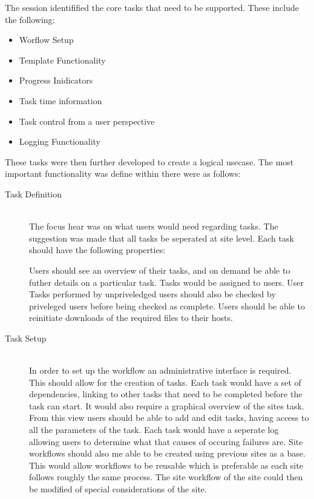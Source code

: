 \documentclass[12pt,a4paper]{report}
\begin{document}
The session identifified the core tasks that need to be supported. These
include the following:
\begin{itemize}
    \item Worflow Setup
    \item Template Functionality
    \item Progress Inidicators
    \item Task time information
    \item Task control from a user perspective
    \item Logging Functionality
\end{itemize}
These tasks were then further developed to create a logical usecase. The
most important functionality was define within there were as follows:
\begin{description}
    \item[Task Definition] \hfill \\
        The focus hear was on what users would need regarding tasks.
        The suggestion was made that all tasks be seperated at site level.
        Each task should have the following properties:
        Users should see an overview of their tasks, and on demand be able to
        futher details on a particular task. Tasks would be assigned to users.
        User Tasks performed by unpriveledged users should also be checked by
        priveleged users before being checked as complete. Users should be
        able to reinitiate downloads of the required files to their hosts.

    \item[Task Setup] \hfill \\
        In order to set up the workflow an administrative interface is required.
        This should allow for the creation of tasks. Each task would have a set
        of dependencies, linking to other tasks that need to be completed before
        the task can start. It would also require a graphical overview of the
        sites task. From this view users should be able to add and edit tasks,
        having access to all the parameters of the task. Each task would have
        a seperate log allowing users to determine what that causes of occuring
        failures are. Site workflows should also me able to be created using
        previous sites as a base. This would allow workflows to be reusable which
        is preferable as each site follows roughly the same process. The site
        workflow of the site could then be modified of special considerations
        of the site.
\end{description}
\end{document}
